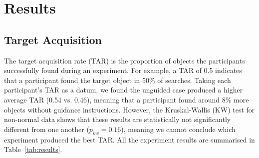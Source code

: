 \documentclass[runningheads]{llncs}
\begin{document}





\section{Results}\label{sec:results}

\subsection{Target Acquisition}


The target acquisition rate (TAR) is the proportion of objects the participants successfully found during an experiment. 
For example, a TAR of 0.5 indicates that a participant found the target object in 50\% of searches. 
Taking each participant's TAR as a datum, we found the unguided case produced a higher average TAR (0.54 vs. 0.46), meaning that a participant found around 8\% more objects without guidance instructions.
However, the Kruskal-Wallis (KW) test for non-normal data shows that these results are statistically not significantly different from one another ($p_{kw} = 0.16$), meaning we cannot conclude which experiment produced the best TAR. 
All the experiment results are summarised in Table~\ref{tab:results}. 
\end{document}

